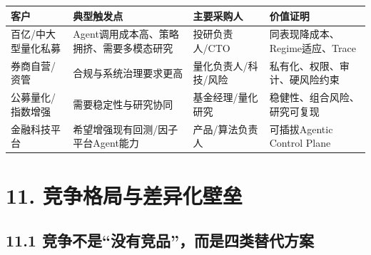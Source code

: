 \documentclass[12pt,a4paper]{ctexart}
\begin{document}
\begin{longtable}[]{@{}
  >{\raggedright\arraybackslash}p{}
  >{\raggedright\arraybackslash}p{}
  >{\raggedright\arraybackslash}p{}
  >{\raggedright\arraybackslash}p{}@{}}
\toprule\noalign{}
\begin{minipage}[b]{\linewidth}\centering
\textbf{客户}
\end{minipage} & \begin{minipage}[b]{\linewidth}\centering
\textbf{典型触发点}
\end{minipage} & \begin{minipage}[b]{\linewidth}\centering
\textbf{主要采购人}
\end{minipage} & \begin{minipage}[b]{\linewidth}\centering
\textbf{价值证明}
\end{minipage} \\
\midrule\noalign{}
\endhead
\bottomrule\noalign{}
\endlastfoot
百亿/中大型量化私募 & Agent调用成本高、策略拥挤、需要多模态研究 &
投研负责人/CTO & 同表现降成本、Regime适应、Trace \\
券商自营/资管 & 合规与系统治理要求更高 & 量化负责人/科技/风险 &
私有化、权限、审计、硬风险约束 \\
公募量化/指数增强 & 需要稳定性与研究协同 & 基金经理/量化研究 &
稳健性、组合风险、研究可复现 \\
金融科技平台 & 希望增强现有回测/因子平台Agent能力 & 产品/算法负责人 &
可插拔Agentic Control Plane \\
\end{longtable}

\section{\texorpdfstring{\textbf{11.
竞争格局与差异化壁垒}}{11. 竞争格局与差异化壁垒}}\label{ux7adeux4e89ux683cux5c40ux4e0eux5deeux5f02ux5316ux58c1ux5792}

\subsection{\texorpdfstring{\textbf{11.1
竞争不是``没有竞品''，而是四类替代方案}}{11.1 竞争不是``没有竞品''，而是四类替代方案}}\label{ux7adeux4e89ux4e0dux662fux6ca1ux6709ux7adeux54c1ux800cux662fux56dbux7c7bux66ffux4ee3ux65b9ux6848}
\end{document}
